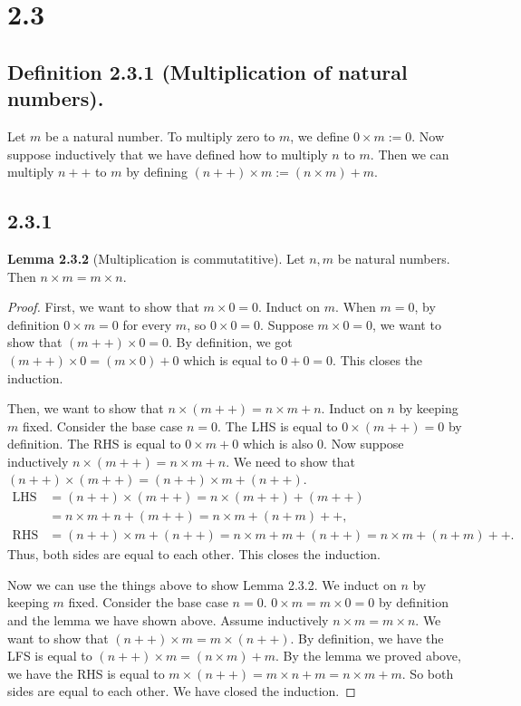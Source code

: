 \documentclass[12pt, letter]{article}
\begin{document}
\section*{2.3}
\subsection*{Definition 2.3.1 (Multiplication of natural numbers).}
Let $m$ be a natural number. To multiply zero to $m$, we define $0\times m:=0$. Now suppose inductively that we have defined how to multiply $n$ to $m$. Then we can multiply $n++$ to $m$ by defining $(n++)\times m:=(n\times m)+m$.
\subsection*{2.3.1}
\textbf{Lemma 2.3.2} (Multiplication is commutatitive). Let $n,m$ be natural numbers. Then $n\times m=m\times n$.
\begin{proof}
    First, we want to show that $m\times 0=0$. Induct on $m$. When $m=0$, by definition $0\times m=0$ for every $m$, so $0\times 0=0$. Suppose $m\times 0=0$, we want to show that $(m++)\times 0=0$. By definition, we got $(m++)\times 0=(m\times 0)+0$ which is equal to $0+0=0$. 
    This closes the induction.

    Then, we want to show that $n\times(m++)=n\times m+n$. Induct on $n$ by keeping $m$ fixed. Consider the base case $n=0$. The LHS is equal to $0\times(m++)=0$ by definition. The RHS is equal to 
    $0\times m+0$ which is also 0. Now suppose inductively $n\times (m++)=n\times m+n$. We need to show that $(n++)\times (m++)=(n++)\times m+(n++)$. 
    \begin{equation*}
        \begin{aligned}
            \text{LHS}&=(n++)\times(m++)=n\times (m++)+(m++)\\&=n\times m+n+(m++)=n\times m+(n+m)++,\\
            \text{RHS}&=(n++)\times m+(n++)=n\times m+m+(n++)=n\times m+(n+m)++.
        \end{aligned}
    \end{equation*}
    Thus, both sides are equal to each other. This closes the induction.

    Now we can use the things above to show Lemma 2.3.2. We induct on $n$ by keeping $m$ fixed. Consider the base case $n=0$. $0\times m=m\times 0=0$ by definition and the lemma we have shown above. Assume inductively $n\times m = m\times n$. We want to show that 
    $(n++)\times m=m\times (n++)$. By definition, we have the LFS is equal to $(n++)\times m=(n\times m)+m$. By the lemma we proved above, we have the RHS is equal to $m\times(n++)=m\times n+m=n\times m+m$. So both sides are equal to each other. We have closed the induction.  
\end{proof}
\end{document}
